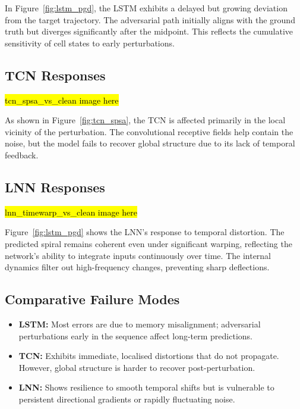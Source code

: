 In Figure~\ref{fig:lstm_pgd}, the LSTM exhibits a delayed but growing deviation from the target trajectory. The adversarial path initially aligns with the ground truth but diverges significantly after the midpoint. This reflects the cumulative sensitivity of cell states to early perturbations.

\subsection*{TCN Responses}

\hl{tcn\_spsa\_vs\_clean image here}


As shown in Figure~\ref{fig:tcn_spsa}, the TCN is affected primarily in the local vicinity of the perturbation. The convolutional receptive fields help contain the noise, but the model fails to recover global structure due to its lack of temporal feedback.

\subsection*{LNN Responses}

\hl{lnn\_timewarp\_vs\_clean image here}


Figure~\ref{fig:lstm_pgd} shows the LNN's response to temporal distortion. The predicted spiral remains coherent even under significant warping, reflecting the network's ability to integrate inputs continuously over time. The internal dynamics filter out high-frequency changes, preventing sharp deflections.

\subsection*{Comparative Failure Modes}

\begin{itemize}
    \item \textbf{LSTM:} Most errors are due to memory misalignment; adversarial perturbations early in the sequence affect long-term predictions.
    \item \textbf{TCN:} Exhibits immediate, localised distortions that do not propagate. However, global structure is harder to recover post-perturbation.
    \item \textbf{LNN:} Shows resilience to smooth temporal shifts but is vulnerable to persistent directional gradients or rapidly fluctuating noise.
\end{itemize}

